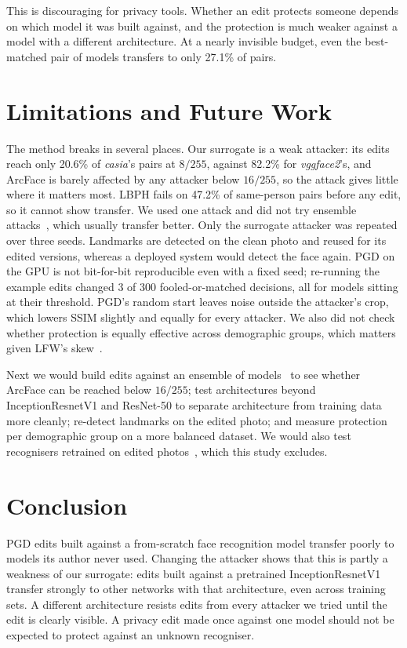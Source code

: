 \documentclass[conference]{IEEEtran}
\begin{document}
This is discouraging for privacy tools. Whether an edit protects someone depends on which model it was built
against, and the protection is much weaker against a model with a different architecture. At a nearly invisible
budget, even the best-matched pair of models transfers to only 27.1\% of pairs.

\section{Limitations and Future Work}
The method breaks in several places. Our surrogate is a weak attacker: its edits reach only 20.6\% of \emph{casia}'s
pairs at $8/255$, against 82.2\% for \emph{vggface2}'s, and ArcFace is barely affected by any attacker below
$16/255$, so the attack gives little where it matters most. LBPH fails on 47.2\% of same-person pairs before any
edit, so it cannot show transfer. We used one attack and did not try ensemble attacks~\cite{liu2017}, which usually
transfer better. Only the surrogate attacker was repeated over three seeds. Landmarks are detected on the clean
photo and reused for its edited versions, whereas a deployed system would detect the face again. PGD on the GPU is
not bit-for-bit reproducible even with a fixed seed; re-running the example edits changed 3 of 300
fooled-or-matched decisions, all for models sitting at their threshold. PGD's random start leaves noise outside the
attacker's crop, which lowers SSIM slightly and equally for every attacker. We also did not check whether
protection is equally effective across demographic groups, which matters given LFW's skew~\cite{hanjain}.

Next we would build edits against an ensemble of models~\cite{liu2017} to see whether ArcFace can be reached below
$16/255$; test architectures beyond InceptionResnetV1 and ResNet-50 to separate architecture from training data
more cleanly; re-detect landmarks on the edited photo; and measure protection per demographic group on a more
balanced dataset. We would also test recognisers retrained on edited photos~\cite{radiya}, which this study
excludes.

\section{Conclusion}
PGD edits built against a from-scratch face recognition model transfer poorly to models its author never used.
Changing the attacker shows that this is partly a weakness of our surrogate: edits built against a pretrained
InceptionResnetV1 transfer strongly to other networks with that architecture, even across training sets. A
different architecture resists edits from every attacker we tried until the edit is clearly visible. A privacy
edit made once against one model should not be expected to protect against an unknown recogniser.
\end{document}
